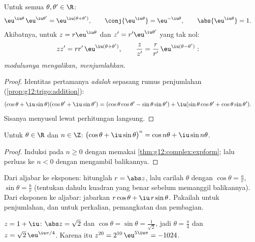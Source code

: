 \begin{theorem}\label{thm:g12:complex:expform}
Untuk semua $\theta, \theta' \in \R$:
\[
\eu^{\iu\theta}\,\eu^{\iu\theta'} = \eu^{\iu(\theta + \theta')},
\qquad
\conj{\eu^{\iu\theta}} = \eu^{-\iu\theta},
\qquad
\abs{\eu^{\iu\theta}} = 1 .
\]
Akibatnya, untuk $z = r\eu^{\iu\theta}$ dan $z' = r'\eu^{\iu\theta'}$
yang tak nol:
\[
zz' = rr'\,\eu^{\iu(\theta+\theta')},
\qquad
\frac{z}{z'} = \frac{r}{r'}\,\eu^{\iu(\theta - \theta')} :
\]
\emph{modulusnya mengalikan,  menjumlahkan.}
\end{theorem}

\begin{proof}
Identitas pertamanya \emph{adalah} sepasang rumus penjumlahan
(\cref{prop:g12:trigo:addition}):
\[
(\cos\theta + \iu\sin\theta)(\cos\theta' + \iu\sin\theta')
= (\cos\theta\cos\theta' - \sin\theta\sin\theta')
+ \iu(\sin\theta\cos\theta' + \cos\theta\sin\theta').
\]
Sisanya menyusul lewat perhitungan langsung.
\end{proof}

\begin{corollary}\label{cor:g12:complex:demoivre}
Untuk $\theta \in \R$ dan $n \in \Z$:
$\bigl(\cos\theta + \iu\sin\theta\bigr)^n = \cos n\theta + \iu \sin n\theta$.
\end{corollary}

\begin{proof}
Induksi pada $n \geq 0$ dengan memakai \cref{thm:g12:complex:expform}; lalu
perluas ke $n < 0$ dengan mengambil balikannya.
\end{proof}

\begin{method}\label{met:g12:complex:forms}
Dari aljabar ke eksponen: hitunglah $r = \abs z$, lalu carilah $\theta$ dengan
$\cos\theta = \frac ar$, $\sin\theta = \frac br$ (tentukan dahulu kuadran yang benar
sebelum memanggil  balikannya). Dari eksponen ke aljabar: jabarkan
$r\cos\theta + \iu\, r\sin\theta$. Pakailah  untuk penjumlahan, dan
 untuk perkalian, pemangkatan dan pembagian.
\end{method}

\begin{example}
$z = 1 + \iu$: $\abs z = \sqrt2$ dan $\cos\theta = \sin\theta =
\frac{1}{\sqrt2}$, jadi $\theta = \frac\pi4$ dan $z = \sqrt2\,\eu^{\iu\pi/4}$.
Karena itu $z^{20} = 2^{10}\,\eu^{5\iu\pi} = -1024$.
\end{example}

